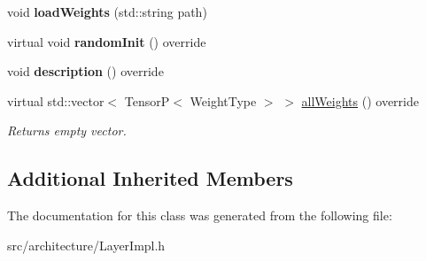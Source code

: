 \begin{DoxyCompactItemize}
void {\bfseries load\+Weights} (std\+::string path)
\item 
\mbox{\label{classZeroPadding2D_af58799e893355789f437a3e945f9d59b}} 
virtual void {\bfseries random\+Init} () override
\item 
\mbox{\label{classZeroPadding2D_ad7240edbd88c790da7f9caae354164d5}} 
void {\bfseries description} () override
\item 
\mbox{\label{classZeroPadding2D_a96419962471edc0e25d594a497dfddb8}} 
virtual std\+::vector$<$ TensorP$<$ Weight\+Type $>$ $>$ \hyperlink{classZeroPadding2D_a96419962471edc0e25d594a497dfddb8}{all\+Weights} () override
\begin{DoxyCompactList}\small\item\em Returns empty vector. \end{DoxyCompactList}\end{DoxyCompactItemize}
\subsection*{Additional Inherited Members}


The documentation for this class was generated from the following file\+:\begin{DoxyCompactItemize}
\item 
src/architecture/Layer\+Impl.\+h\end{DoxyCompactItemize}
